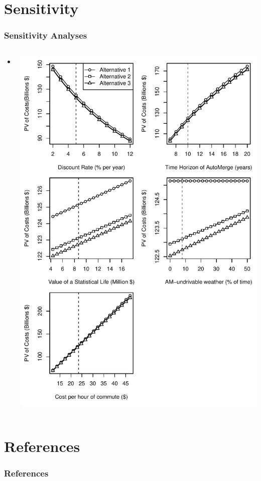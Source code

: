 \documentclass{beamer}
\begin{document}
\section{Sensitivity}
\begin{frame}
  \frametitle{Sensitivity Analyses}
  \begin{columns}
    \begin{column}{0.35\textwidth}
      \begin{itemize}
      \item
      \end{itemize}
    \end{column}
    \begin{column}{0.65\textwidth}
      \centering
      \includegraphics[width=\textwidth]{../../R/sensitivity}
    \end{column}
  \end{columns}
\end{frame}


\section{References}
\begin{frame}
  \frametitle{References}
    \printbibliography[heading=none]
\end{frame}
\end{document}
